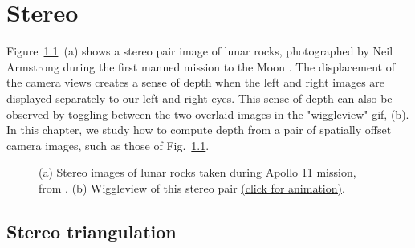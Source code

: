 \chapter{Stereo}

Figure~\ref{fig:lunarRocks}~(a) shows a stereo pair image of lunar rocks, photographed by Neil Armstrong during the first manned mission to the Moon \cite{apolloStereo}.  The displacement of the camera views creates a sense of depth when the left and right images are displayed separately to our left and right eyes.  This sense of depth can also be observed by toggling between the two overlaid images in the
\href{https://groups.csail.mit.edu/vision/cvbook/videos/A11wigglestereo6712.gif}{"wiggleview" gif}, (b).  In this chapter, we study how to compute depth from a pair of spatially offset camera images, such as those of Fig.~\ref{fig:lunarRocks}.

\begin{figure}
\centerline{
}
\caption{(a) Stereo images of lunar rocks taken during Apollo 11 mission, from \cite{nasaApollo11}.  (b) Wiggleview of this stereo pair \href{https://groups.csail.mit.edu/vision/cvbook/videos/A11wigglestereo6712.gif}{(click for animation)}.}
\label{fig:lunarRocks}
\end{figure}


\section{Stereo triangulation}


